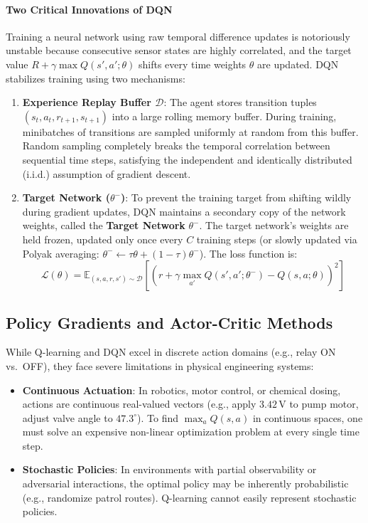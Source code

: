 \paragraph{Two Critical Innovations of DQN}
Training a neural network using raw temporal difference updates is notoriously unstable because consecutive sensor states are highly correlated, and the target value $R + \gamma \max Q(s', a'; \theta)$ shifts every time weights $\theta$ are updated. DQN stabilizes training using two mechanisms:
\begin{enumerate}
    \item \textbf{Experience Replay Buffer $\mathcal{D}$}: The agent stores transition tuples $(s_t, a_t, r_{t+1}, s_{t+1})$ into a large rolling memory buffer. During training, minibatches of transitions are sampled uniformly at random from this buffer. Random sampling completely breaks the temporal correlation between sequential time steps, satisfying the independent and identically distributed (i.i.d.) assumption of gradient descent.
    \item \textbf{Target Network ($\theta^-$)}: To prevent the training target from shifting wildly during gradient updates, DQN maintains a secondary copy of the network weights, called the \textbf{Target Network} $\theta^-$. The target network's weights are held frozen, updated only once every $C$ training steps (or slowly updated via Polyak averaging: $\theta^- \leftarrow \tau \theta + (1 - \tau)\theta^-$). The loss function is:
    \begin{equation}
    \mathcal{L}(\theta) = \mathbb{E}_{(s, a, r, s') \sim \mathcal{D}}\left[ \left( r + \gamma \max_{a'} Q(s', a'; \theta^-) - Q(s, a; \theta) \right)^2 \right]\label{eq:dqn_loss}
    \end{equation}
\end{enumerate}

\subsection{Policy Gradients and Actor-Critic Methods}\label{subsec:policy_gradients}

While Q-learning and DQN excel in discrete action domains (e.g., relay ON vs.\ OFF), they face severe limitations in physical engineering systems:
\begin{itemize}
    \item \textbf{Continuous Actuation}: In robotics, motor control, or chemical dosing, actions are continuous real-valued vectors (e.g., apply $3.42\,\text{V}$ to pump motor, adjust valve angle to $47.3^\circ$). To find $\max_a Q(s, a)$ in continuous spaces, one must solve an expensive non-linear optimization problem at every single time step.
    \item \textbf{Stochastic Policies}: In environments with partial observability or adversarial interactions, the optimal policy may be inherently probabilistic (e.g., randomize patrol routes). Q-learning cannot easily represent stochastic policies.
\end{itemize}

